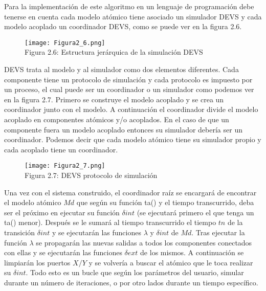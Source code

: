 Para la implementación de este algoritmo en un lenguaje de programación debe tenerse en cuenta cada modelo atómico tiene asociado un simulador DEVS y cada modelo acoplado un coordinador DEVS, como se puede ver en la figura 2.6.
\bigskip

\begin{figure}[!ht]
\begin{center}
\texttt{[image: Figura2\_6.png]}\\[0.5cm]
Figura 2.6: Estructura jerárquica de la simulación DEVS
\end{center}
\end{figure}

DEVS trata al modelo y al simulador como dos elementos diferentes. Cada componente tiene un protocolo de simulación y cada protocolo es impuesto por un proceso, el cual puede ser un coordinador o un simulador como podemos ver en la figura 2.7.
Primero se construye el modelo acoplado y se crea un coordinador junto con el modelo. A continuación el coordinador divide el modelo acoplado en componentes atómicos y/o acoplados. En el caso de que un componente fuera un modelo acoplado entonces su simulador debería ser un coordinador. Podemos decir que cada modelo atómico tiene su simulador propio y cada acoplado tiene un coordinador.

\begin{figure}[!ht]
\begin{center}
\texttt{[image: Figura2\_7.png]}\\[0.5cm]
Figura 2.7: DEVS protocolo de simulación
\end{center}
\end{figure}

Una vez con el sistema construido, el coordinador raíz se encargará de encontrar el modelo atómico $M{d}$ que según su función ta() y el tiempo transcurrido, deba ser el próximo en ejecutar su función $\delta{int}$ (se ejecutará primero el que tenga un ta() menor). Después se le sumará al tiempo transcurrido el tiempo $t{n}$ de la transición $\delta{int}$ y se ejecutarán las funciones $\lambda$ y $\delta{int}$ de $M{d}$.
Tras ejecutar la función $\lambda$ se propagarán las nuevas salidas a todos los componentes conectados con ellas y se ejecutarán las funciones $\delta{ext}$ de los mismos. A continuación se limpiarán los puertos $X/Y$ y se volvería a buscar el atómico que le toca realizar su $\delta{int}$. Todo esto es un bucle que según los parámetros del usuario, simular durante un número de iteraciones, o por otro lados durante un tiempo específico.

